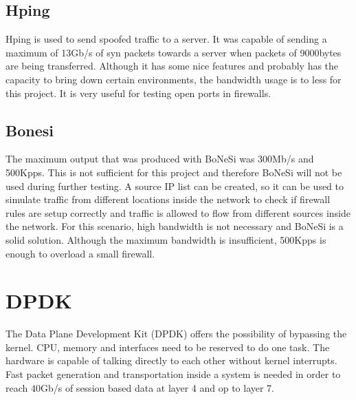 \subsection{Hping}
Hping is used to send spoofed traffic to a server. It was capable of sending a maximum of 13Gb/s of syn packets towards a server when packets of 9000bytes are being transferred. Although it has some nice features and probably has the capacity to bring down certain environments, the bandwidth usage  is to less for this project. It is very useful for testing open ports in firewalls.  

\subsection{Bonesi}
The maximum output that was produced with BoNeSi was 300Mb/s and 500Kpps. This is not sufficient for this project and therefore BoNeSi will not be used during further testing. A source IP list can be created, so it can be used to simulate traffic from different locations inside the network to check if firewall rules are setup correctly and traffic is allowed to flow from different sources inside the network. For this scenario, high bandwidth is not necessary and BoNeSi is a solid solution. Although the maximum bandwidth is insufficient, 500Kpps is enough to overload a small firewall.  

\section{DPDK}
The Data Plane Development Kit (DPDK) offers the possibility of bypassing the kernel. CPU, memory and interfaces need to be reserved to do one task. The hardware is capable of talking directly to each other without kernel interrupts. Fast packet generation and transportation inside a system is needed in order to reach 40Gb/s of session based data at layer 4 and op to layer 7. 

